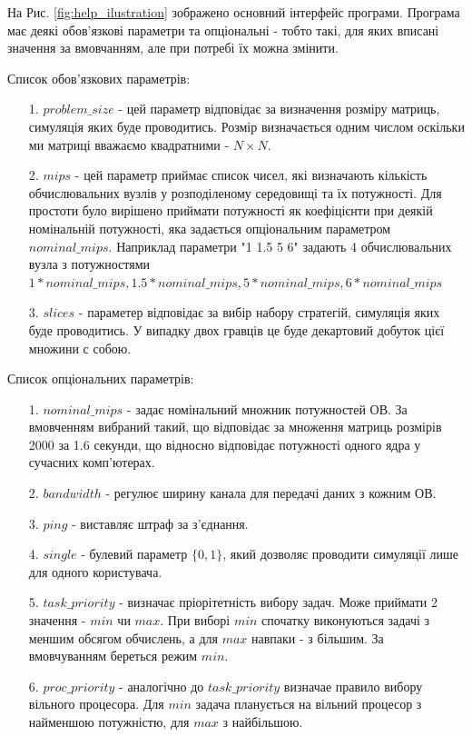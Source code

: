 На Рис. \ref{fig:help_ilustration} зображено основний інтерфейс програми. Програма має деякі обов'язкові параметри та опціональні - тобто такі, для яких вписані значення за вмовчанням, але при потребі їх можна змінити.

Список обов'язкових параметрів:
\begin{itemize}
	\item[1.] $problem\_size$ - цей параметр відповідає за визначення розміру матриць, симуляція яких буде проводитись. Розмір визначається одним числом оскільки ми матриці вважаємо квадратними - $N \times N$.
	\item[2.] $mips$ - цей параметр приймає список чисел, які визначають кількість обчислювальних вузлів у розподіленому середовищі та їх потужності. Для простоти було вирішено приймати потужності як коефіцієнти при деякій номінальній потужності, яка задається опціональним параметром $nominal\_mips$. Наприклад параметри "1 1.5 5 6" задають 4 обчислювальних вузла з потужностями $1*nominal\_mips, 1.5*nominal\_mips, 5*nominal\_mips, 6*nominal\_mips$
	\item[3.] $slices$ - параметер відповідає за вибір набору стратегій, симуляція яких буде проводитись. У випадку двох гравців це буде декартовий добуток цієї множини с собою.
\end{itemize}

Список опціональних параметрів:
\begin{itemize}
	\item[1.] $nominal\_mips$ - задає номінальний множник потужностей ОВ. За вмовченням вибраний такий, що відповідає за множення матриць розмірів 2000 за 1.6 секунди, що відносно відповідає потужності одного ядра у сучасних комп'ютерах.
	\item[2.] $bandwidth$ - регулює ширину канала для передачі даних з кожним ОВ.
	\item[3.] $ping$ - виставляє штраф за з'єднання.
	\item[4.] $single$ - булевий параметр $\{0,1\}$, який дозволяє проводити симуляції лише для одного користувача.
	\item[5.] $task\_priority$ - визначає пріорітетність вибору задач. Може приймати 2 значення - $min$ чи $max$. При виборі $min$ спочатку виконуються задачі з меншим обсягом обчислень, а для $max$ навпаки - з більшим. За вмовчуванням береться режим $min$.
	\item[6.] $proc\_priority$ - аналогічно до $task\_priority$ визначае правило вибору вільного процесора. Для $min$ задача планується на вільний процесор з найменшою потужністю, для $max$ з найбільшою.
\end{itemize}

